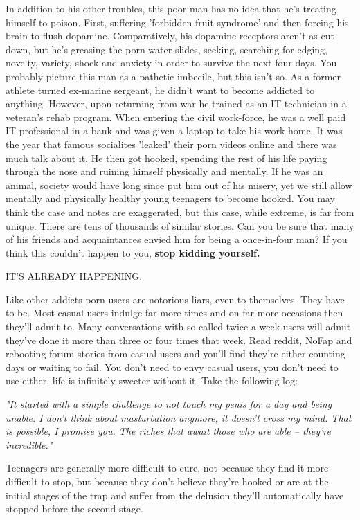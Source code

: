 \documentclass[easypeasy]{subfiles}
\begin{document}
In addition to his other troubles, this poor man has no idea that he's treating himself to poison. First, suffering 'forbidden fruit syndrome' and then forcing his brain to flush dopamine. Comparatively, his dopamine receptors aren't as cut down, but he's greasing the porn water slides, seeking, searching for edging, novelty, variety, shock and anxiety in order to survive the next four days. You probably picture this man as a pathetic imbecile, but this isn't so. As a former athlete turned ex-marine sergeant, he didn't want to become addicted to anything. However, upon returning from war he trained as an IT technician in a veteran's rehab program. When entering the civil work-force, he was a well paid IT professional in a bank and was given a laptop to take his work home. It was the year that famous socialites 'leaked' their porn videos online and there was much talk about it. He then got hooked, spending the rest of his life paying through the nose and ruining himself physically and mentally. If he was an animal, society would have long since put him out of his misery, yet we still allow mentally and physically healthy young teenagers to become hooked. You may think the case and notes are exaggerated, but this case, while extreme, is far from unique. There are tens of thousands of similar stories. Can you be sure that many of his friends and acquaintances envied him for being a once-in-four man? If you think this couldn't happen to you, \textbf{stop kidding yourself.}

{\huge IT'S ALREADY HAPPENING.}

Like other addicts porn users are notorious liars, even to themselves. They have to be. Most casual users indulge far more times and on far more occasions then they'll admit to. Many conversations with so called twice-a-week users will admit they've done it more than three or four times that week. Read reddit, NoFap and rebooting forum stories from casual users and you'll find they're either counting days or waiting to fail. You don't need to envy casual users, you don't need to use either, life is infinitely sweeter without it. Take the following log:

  \textit{"It started with a simple challenge to not touch my penis for a day and being unable. I don't think about masturbation anymore, it doesn't cross my mind. That is possible, I promise you. The riches that await those who are able -- they're incredible."}

Teenagers are generally more difficult to cure, not because they find it more difficult to stop, but because they don't believe they're hooked or are at the initial stages of the trap and suffer from the delusion they'll automatically have stopped before the second stage.
\end{document}
